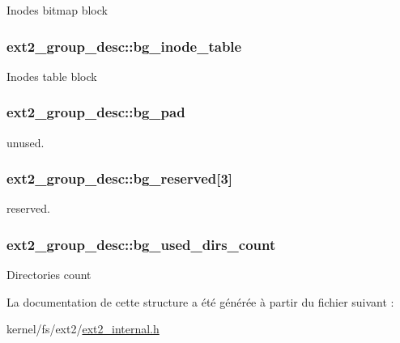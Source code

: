 Inodes bitmap block \hypertarget{structext2__group__desc_abf527c572a5fe30354cdf2cfc4f88b26}{
\subsubsection[{bg\-\_\-inode\-\_\-table}]{ ext2\-\_\-group\-\_\-desc\-::bg\-\_\-inode\-\_\-table}}\label{structext2__group__desc_abf527c572a5fe30354cdf2cfc4f88b26}
Inodes table block \hypertarget{structext2__group__desc_ac99983cee73aa4aace5c7d51b6d5a7e1}{
\subsubsection[{bg\-\_\-pad}]{ ext2\-\_\-group\-\_\-desc\-::bg\-\_\-pad}}\label{structext2__group__desc_ac99983cee73aa4aace5c7d51b6d5a7e1}
unused. \hypertarget{structext2__group__desc_aff7f7dc0b67aed284218b238991f5c93}{
\subsubsection[{bg\-\_\-reserved}]{ ext2\-\_\-group\-\_\-desc\-::bg\-\_\-reserved\mbox{[}3\mbox{]}}}\label{structext2__group__desc_aff7f7dc0b67aed284218b238991f5c93}
reserved. \hypertarget{structext2__group__desc_adc9924671cb04dd63b4b7ffff8c262dc}{
\subsubsection[{bg\-\_\-used\-\_\-dirs\-\_\-count}]{ ext2\-\_\-group\-\_\-desc\-::bg\-\_\-used\-\_\-dirs\-\_\-count}}\label{structext2__group__desc_adc9924671cb04dd63b4b7ffff8c262dc}
Directories count 

La documentation de cette structure a été générée à partir du fichier suivant \-:\begin{DoxyCompactItemize}
\item 
kernel/fs/ext2/\hyperlink{ext2__internal_8h}{ext2\-\_\-internal.\-h}\end{DoxyCompactItemize}
